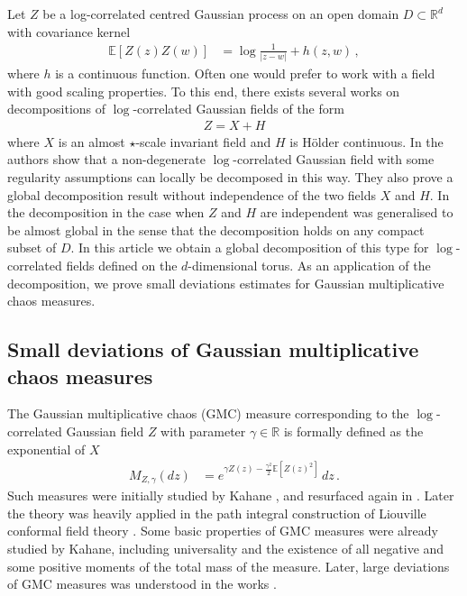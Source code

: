 \documentclass[11pt]{article}
\numberwithin{equation}{section}
\theoremstyle{definition}
\newcommand{\R}{\mathbb{R}}
\newcommand{\E}{\mathbb{E}}
\begin{document}
Let $Z$ be a log-correlated centred Gaussian process on an open domain $D \subset \R^d$ with covariance kernel
\begin{align*}
\E[Z(z)Z(w)] &= \log \frac{1}{|z-w|} + h(z,w)\,,
\end{align*}
where $h$ is a continuous function. Often one would prefer to work with a field with good scaling properties. To this end, there exists several works on decompositions of $\log$-correlated Gaussian fields of the form
\begin{align*}
Z = X + H
\end{align*}
where $X$ is an almost $\star$-scale invariant field and $H$ is Hölder continuous. In \cite{JSW} the authors show that a non-degenerate $\log$-correlated Gaussian field with some regularity assumptions can locally be decomposed in this way. They also prove a global decomposition result without independence of the two fields  $X$ and $H$. In \cite{AJJ} the decomposition in the case when $Z$ and $H$ are independent was generalised to be almost global in the sense that the decomposition holds on any compact subset of $D$. In this article we obtain a global decomposition of this type for $\log$-correlated fields defined on the $d$-dimensional torus. As an application of the decomposition, we prove small deviations estimates for Gaussian multiplicative chaos measures.

\subsection{Small deviations of Gaussian multiplicative chaos measures}

The Gaussian multiplicative chaos (GMC) measure corresponding to the $\log$-correlated Gaussian field $Z$ with parameter $\gamma \in \R$ is formally defined as the exponential of $X$
\begin{align*}
M_{Z,\gamma}(dz) &= e^{\gamma Z(z) - \frac{\gamma^2}{2} \E[Z(z)^2] } \, dz\,.
\end{align*}
Such measures were initially studied by Kahane \cite{Kah}, and resurfaced again in \cite{RoVa, ds}. Later the theory was heavily applied in the path integral construction of Liouville conformal field theory \cite{DKRV}. Some basic properties of GMC measures were already studied by Kahane, including universality and the existence of all negative and some positive moments of the total mass of the measure. Later, large deviations of GMC measures was understood in the works \cite{ldp, modick1, modick2}.
\end{document}
